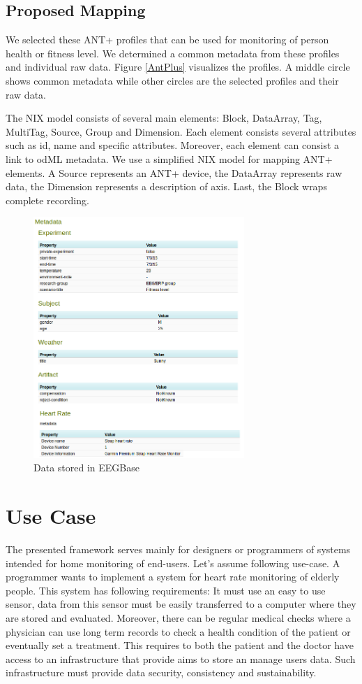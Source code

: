\documentclass[conference]{IEEEtran}
\begin{document}
\subsection{Proposed Mapping}

We selected these ANT+ profiles that can be used for monitoring of person health or fitness level. We determined a common metadata from these profiles and individual raw data. Figure \ref{AntPlus} visualizes the profiles. A middle circle shows common metadata while other circles are the selected profiles and their raw data. 

The NIX model consists of several main elements: Block, DataArray, Tag, MultiTag, Source, Group and Dimension. Each element consists several attributes such as id, name and specific attributes. Moreover, each element can consist a link to odML metadata. We use a simplified NIX model for mapping ANT+ elements. A Source represents an ANT+ device, the DataArray represents raw data, the Dimension represents a description of axis. Last, the Block wraps complete recording.

\begin{figure}
  \centering\includegraphics[width=8cm]{portal_example.png}
  \caption{Data stored in EEGBase}
  \label{fig:EEGBase}
 \end{figure}


\section{Use Case}\label{sec:use-case}

The presented framework serves mainly for designers or programmers of systems intended for home monitoring of end-users. Let's assume following use-case. A programmer wants to implement a system for heart rate monitoring of elderly people. This system has following requirements: It must use an easy to use sensor, data from this sensor must be easily transferred to a computer where they are stored and evaluated. Moreover, there can be regular medical checks where a physician can use long term records to check a health condition of the patient or eventually set a treatment. This requires to both the patient and the doctor have access to an infrastructure that provide aims to store an manage users data. Such infrastructure must provide data security, consistency and sustainability.
\end{document}
